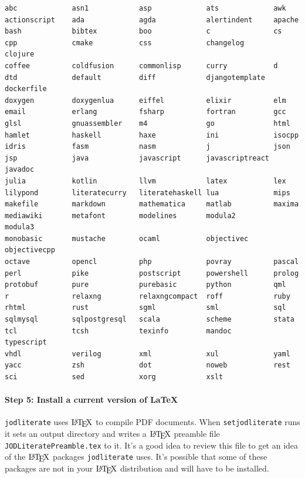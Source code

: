 \documentclass[11pt]{article}
\let\Oldlatex\LaTeX
\renewcommand{\LaTeX}{\textrm{\Oldlatex}}
\begin{document}
    \begin{Verbatim}[commandchars=\\\{\}]
abc             asn1            asp             ats             awk
actionscript    ada             agda            alertindent     apache
bash            bibtex          boo             c               cs
cpp             cmake           css             changelog       clojure
coffee          coldfusion      commonlisp      curry           d
dtd             default         diff            djangotemplate  dockerfile
doxygen         doxygenlua      eiffel          elixir          elm
email           erlang          fsharp          fortran         gcc
glsl            gnuassembler    m4              go              html
hamlet          haskell         haxe            ini             isocpp
idris           fasm            nasm            j               json
jsp             java            javascript      javascriptreact javadoc
julia           kotlin          llvm            latex           lex
lilypond        literatecurry   literatehaskell lua             mips
makefile        markdown        mathematica     matlab          maxima
mediawiki       metafont        modelines       modula2         modula3
monobasic       mustache        ocaml           objectivec      objectivecpp
octave          opencl          php             povray          pascal
perl            pike            postscript      powershell      prolog
protobuf        pure            purebasic       python          qml
r               relaxng         relaxngcompact  roff            ruby
rhtml           rust            sgml            sml             sql
sqlmysql        sqlpostgresql   scala           scheme          stata
tcl             tcsh            texinfo         mandoc          typescript
vhdl            verilog         xml             xul             yaml
yacc            zsh             dot             noweb           rest
sci             sed             xorg            xslt
    \end{Verbatim}

    \hypertarget{step-5-install-a-current-version-of-latex}{%
\paragraph{Step 5: Install a current version of
LaTeX}\label{step-5-install-a-current-version-of-latex}}

\texttt{jodliterate} uses \(\LaTeX\) to compile PDF documents. When
\texttt{setjodliterate} runs it sets an output directory and writes a
\(\LaTeX\) preamble file \texttt{JODLiteratePreamble.tex} to it. It's a
good idea to review this file to get an idea of the \(\LaTeX\) packages
\texttt{jodliterate} uses. It's possible that some of these packages are
not in your \(\LaTeX\) distribution and will have to be installed.
\end{document}
